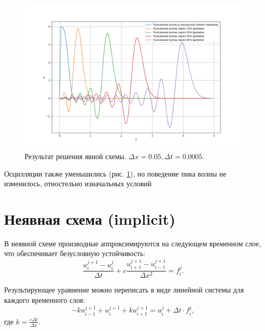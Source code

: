 \begin{figure}[h]  %
	\centering
	\includegraphics[height=0.7\textwidth]{imgs/explicit_2t.png}  %
	\caption{Результат решения явной схемы. $\Delta x = 0.05 , \Delta t = 0.0005$.}  %
	\label{fig:explicit_2t}  %
\end{figure}

Осцилляции также уменьшились (рис. \ref{fig:explicit_2t}), но поведение пика волны не изменилось, отностельно изначальных условий
\newpage
\section{Неявная схема (implicit)}

В неявной схеме производные аппроксимируются на следующем временном слое, что обеспечивает безусловную устойчивость:
$$
	\frac{u_i^{j+1} - u_i^j}{\Delta t} + c\frac{u_{i +1}^{j+1} - u_{i-1}^{j+1}}{\Delta x^2} =  f_{i}^{j}.
$$

Результирующее уравнение можно переписать в виде линейной системы для каждого временного слоя:
$$
	- k u_{i-1}^{j+1} + u_i^{j+1} + k u_{i+1}^{j+1} = u_i^j+ \Delta t \cdot  f_{i}^{j},
$$
где $ k = \frac{c \Delta t}{ \Delta x}.$

